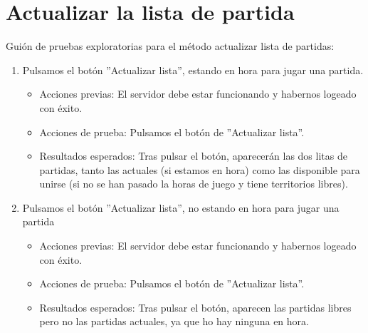 \section{Actualizar la lista de partida}

Guión de pruebas exploratorias para el método actualizar lista de partidas:

\begin{enumerate}
\item Pulsamos el botón ''Actualizar lista'', estando en hora para jugar una partida.
	\begin{itemize}
	\item Acciones previas: El servidor debe estar funcionando y habernos logeado con éxito.
	\item Acciones de prueba: Pulsamos el botón de ''Actualizar lista''.
	\item Resultados esperados: Tras pulsar el botón, aparecerán las dos litas de partidas, tanto las actuales (si estamos en hora) como las disponible para unirse (si no se han pasado la horas de juego y tiene territorios libres).
	\end{itemize}
\item Pulsamos el botón ''Actualizar lista'', no estando en hora para jugar una partida
	\begin{itemize}
	\item Acciones previas: El servidor debe estar funcionando y habernos logeado con éxito.
	\item Acciones de prueba: Pulsamos el botón de ''Actualizar lista''.
	\item Resultados esperados: Tras pulsar el botón, aparecen las partidas libres pero no las partidas actuales, ya que ho hay ninguna en hora.
	\end{itemize}
\end{enumerate}
